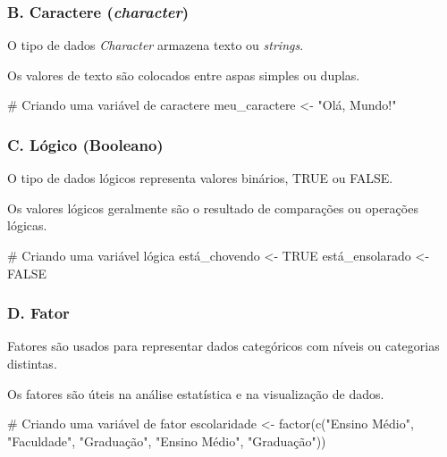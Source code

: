 \documentclass[
  letterpaper,
  DIV=11,
  numbers=noendperiod]{scrartcl}
\newenvironment{Shaded}{\begin{snugshade}}{\end{snugshade}}
\newcommand{\CommentTok}[1]{\textcolor[rgb]{0.37,0.37,0.37}{#1}}
\newcommand{\ConstantTok}[1]{\textcolor[rgb]{0.56,0.35,0.01}{#1}}
\newcommand{\FunctionTok}[1]{\textcolor[rgb]{0.28,0.35,0.67}{#1}}
\newcommand{\NormalTok}[1]{\textcolor[rgb]{0.00,0.23,0.31}{#1}}
\newcommand{\OtherTok}[1]{\textcolor[rgb]{0.00,0.23,0.31}{#1}}
\newcommand{\StringTok}[1]{\textcolor[rgb]{0.13,0.47,0.30}{#1}}
\begin{document}
\hypertarget{b.-caractere-character}{%
\subsubsection{\texorpdfstring{B. Caractere
(\emph{character})}{B. Caractere (character)}}\label{b.-caractere-character}}

O tipo de dados \emph{Character} armazena texto ou \emph{strings}.

Os valores de texto são colocados entre aspas simples ou duplas.

\begin{Shaded}
\begin{Highlighting}[]
\CommentTok{\# Criando uma variável de caractere}
\NormalTok{meu\_caractere }\OtherTok{\textless{}{-}} \StringTok{"Olá, Mundo!"}
\end{Highlighting}
\end{Shaded}

\hypertarget{c.-luxf3gico-booleano}{%
\subsubsection{C. Lógico (Booleano)}\label{c.-luxf3gico-booleano}}

O tipo de dados lógicos representa valores binários, TRUE ou FALSE.

Os valores lógicos geralmente são o resultado de comparações ou
operações lógicas.

\begin{Shaded}
\begin{Highlighting}[]
\CommentTok{\# Criando uma variável lógica}
\NormalTok{está\_chovendo }\OtherTok{\textless{}{-}} \ConstantTok{TRUE}
\NormalTok{está\_ensolarado }\OtherTok{\textless{}{-}} \ConstantTok{FALSE}
\end{Highlighting}
\end{Shaded}

\hypertarget{d.-fator}{%
\subsubsection{D. Fator}\label{d.-fator}}

Fatores são usados para representar dados categóricos com níveis ou
categorias distintas.

Os fatores são úteis na análise estatística e na visualização de dados.

\begin{Shaded}
\begin{Highlighting}[]
\CommentTok{\# Criando uma variável de fator}
\NormalTok{escolaridade }\OtherTok{\textless{}{-}} \FunctionTok{factor}\NormalTok{(}\FunctionTok{c}\NormalTok{(}\StringTok{"Ensino Médio"}\NormalTok{, }\StringTok{"Faculdade"}\NormalTok{, }\StringTok{"Graduação"}\NormalTok{, }\StringTok{"Ensino Médio"}\NormalTok{, }\StringTok{"Graduação"}\NormalTok{))}
\end{Highlighting}
\end{Shaded}
\end{document}
